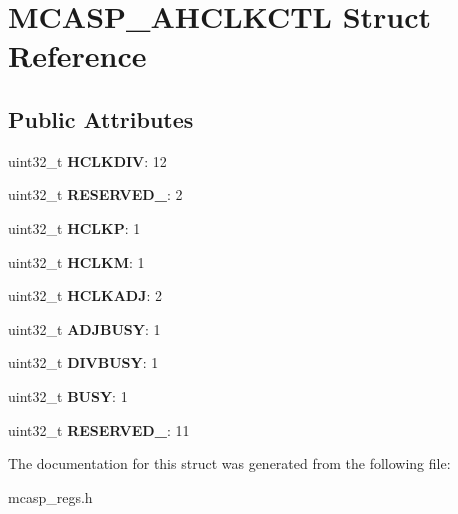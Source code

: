 \hypertarget{structMCASP__AHCLKCTL}{\section{M\-C\-A\-S\-P\-\_\-\-A\-H\-C\-L\-K\-C\-T\-L Struct Reference}
\label{structMCASP__AHCLKCTL}
}
\subsection*{Public Attributes}
\begin{DoxyCompactItemize}
\item 
\hypertarget{structMCASP__AHCLKCTL_a4c1eaebc15e8d5a36eadd9fa05975906}{uint32\-\_\-t {\bfseries H\-C\-L\-K\-D\-I\-V}\-: 12}\label{structMCASP__AHCLKCTL_a4c1eaebc15e8d5a36eadd9fa05975906}

\item 
\hypertarget{structMCASP__AHCLKCTL_a55463662a6c3a289d3faf14fa213ab77}{uint32\-\_\-t {\bfseries R\-E\-S\-E\-R\-V\-E\-D\-\_}\-: 2}\label{structMCASP__AHCLKCTL_a55463662a6c3a289d3faf14fa213ab77}

\item 
\hypertarget{structMCASP__AHCLKCTL_a2bb543a06cf9d4351ee4c9615a8cfc6b}{uint32\-\_\-t {\bfseries H\-C\-L\-K\-P}\-: 1}\label{structMCASP__AHCLKCTL_a2bb543a06cf9d4351ee4c9615a8cfc6b}

\item 
\hypertarget{structMCASP__AHCLKCTL_ae840906a7567381957c9d761dee75f3f}{uint32\-\_\-t {\bfseries H\-C\-L\-K\-M}\-: 1}\label{structMCASP__AHCLKCTL_ae840906a7567381957c9d761dee75f3f}

\item 
\hypertarget{structMCASP__AHCLKCTL_abf37e04367423ab6bb2ea13720249419}{uint32\-\_\-t {\bfseries H\-C\-L\-K\-A\-D\-J}\-: 2}\label{structMCASP__AHCLKCTL_abf37e04367423ab6bb2ea13720249419}

\item 
\hypertarget{structMCASP__AHCLKCTL_a4d8d69d22518e922facebc25d4525946}{uint32\-\_\-t {\bfseries A\-D\-J\-B\-U\-S\-Y}\-: 1}\label{structMCASP__AHCLKCTL_a4d8d69d22518e922facebc25d4525946}

\item 
\hypertarget{structMCASP__AHCLKCTL_a59cf31c9bae978a1d3cf73645964871c}{uint32\-\_\-t {\bfseries D\-I\-V\-B\-U\-S\-Y}\-: 1}\label{structMCASP__AHCLKCTL_a59cf31c9bae978a1d3cf73645964871c}

\item 
\hypertarget{structMCASP__AHCLKCTL_af81d31a33b6a714591a86ea1a4cba3fb}{uint32\-\_\-t {\bfseries B\-U\-S\-Y}\-: 1}\label{structMCASP__AHCLKCTL_af81d31a33b6a714591a86ea1a4cba3fb}

\item 
\hypertarget{structMCASP__AHCLKCTL_a68488c9488c5a12c4429edcf804499a0}{uint32\-\_\-t {\bfseries R\-E\-S\-E\-R\-V\-E\-D\-\_}\-: 11}\label{structMCASP__AHCLKCTL_a68488c9488c5a12c4429edcf804499a0}

\end{DoxyCompactItemize}


The documentation for this struct was generated from the following file\-:\begin{DoxyCompactItemize}
\item 
mcasp\-\_\-regs.\-h\end{DoxyCompactItemize}
